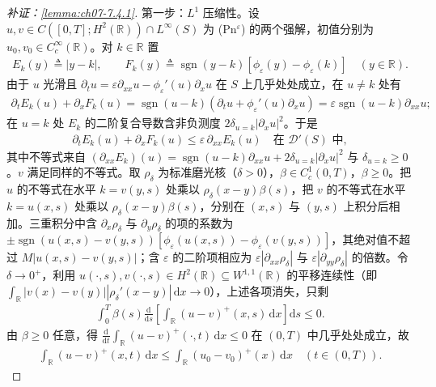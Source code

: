 ﻿\documentclass[../../main.tex]{subfiles}%
\begin{document}
\begin{proof}[补证：\cref{lemma:ch07-7.4.1}]
第一步：$L^1$ 压缩性。设 $u,v\in C([0,T];H^2(\mathbb{R}))\cap L^\infty(S)$ 为 (Pn$^\varepsilon$) 的两个强解，初值分别为 $u_0,v_0\in C^\infty_c(\mathbb{R})$。对 $k\in\mathbb{R}$ 置
\begin{align*}
E_k(y)\triangleq|y-k|,\qquad F_k(y)\triangleq\operatorname{sgn}(y-k)[\phi_\varepsilon(y)-\phi_\varepsilon(k)]\quad(y\in\mathbb{R}).
\end{align*}
由于 $u$ 光滑且 $\partial_tu=\varepsilon\partial_{xx}u-\phi_\varepsilon'(u)\partial_xu$ 在 $S$ 上几乎处处成立，在 $u\neq k$ 处有
\begin{align*}
\partial_tE_k(u)+\partial_xF_k(u)=\operatorname{sgn}(u-k)(\partial_tu+\phi_\varepsilon'(u)\partial_xu)=\varepsilon\operatorname{sgn}(u-k)\partial_{xx}u;
\end{align*}
在 $u=k$ 处 $E_k$ 的二阶复合导数含非负测度 $2\delta_{u=k}|\partial_xu|^2$。于是
\begin{align*}
\partial_tE_k(u)+\partial_xF_k(u)\leqslant\varepsilon\,\partial_{xx}E_k(u)\quad\text{在 }\mathscr{D}'(S)\text{ 中},
\end{align*}
其中不等式来自 $(\partial_{xx}E_k)(u)=\operatorname{sgn}(u-k)\partial_{xx}u+2\delta_{u=k}|\partial_xu|^2$ 与 $\delta_{u=k}\geqslant0$。$v$ 满足同样的不等式。取 $\rho_\delta$ 为标准磨光核（$\delta>0$），$\beta\in C^1_c(0,T)$，$\beta\geqslant0$。把 $u$ 的不等式在水平 $k=v(y,s)$ 处乘以 $\rho_\delta(x-y)\beta(s)$，把 $v$ 的不等式在水平 $k=u(x,s)$ 处乘以 $\rho_\delta(x-y)\beta(s)$，分别在 $(x,s)$ 与 $(y,s)$ 上积分后相加。三重积分中含 $\partial_x\rho_\delta$ 与 $\partial_y\rho_\delta$ 的项的系数为 $\pm\operatorname{sgn}(u(x,s)-v(y,s))[\phi_\varepsilon(u(x,s))-\phi_\varepsilon(v(y,s))]$，其绝对值不超过 $M|u(x,s)-v(y,s)|$；含 $\varepsilon$ 的二阶项相应为 $\varepsilon|\partial_{xx}\rho_\delta|$ 与 $\varepsilon|\partial_{yy}\rho_\delta|$ 的倍数。令 $\delta\to0^+$，利用 $u(\cdot,s),v(\cdot,s)\in H^2(\mathbb{R})\subseteq W^{1,1}(\mathbb{R})$ 的平移连续性（即 $\int_{\mathbb{R}}|v(x)-v(y)||\rho_\delta'(x-y)|\,\mathrm{d}x\to0$），上述各项消失，只剩
\begin{align*}
\int_0^T\beta(s)\frac{\mathrm{d}}{\mathrm{d}s}\left[\int_{\mathbb{R}}(u-v)^+(x,s)\,\mathrm{d}x\right]\mathrm{d}s\leqslant0.
\end{align*}
由 $\beta\geqslant0$ 任意，得 $\frac{\mathrm{d}}{\mathrm{d}t}\int_{\mathbb{R}}(u-v)^+(\cdot,t)\,\mathrm{d}x\leqslant0$ 在 $(0,T)$ 中几乎处处成立，故
\begin{align*}
\int_{\mathbb{R}}(u-v)^+(x,t)\,\mathrm{d}x\leqslant\int_{\mathbb{R}}(u_0-v_0)^+(x)\,\mathrm{d}x\quad(t\in(0,T)).

\end{align*}
\end{proof}
\end{document}
